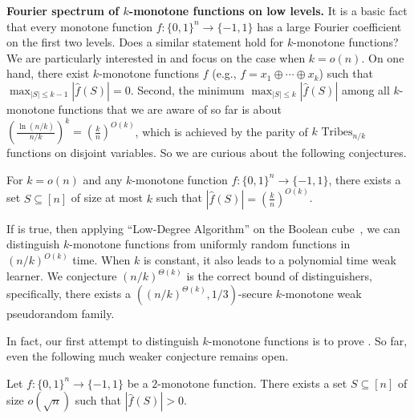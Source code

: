 \documentclass{toc}
\begin{document}
\vspace{2ex}
\noindent\textbf{Fourier spectrum of $k$-monotone functions on low levels.} It is a basic fact \cite{book} that every monotone function $f:\{0,1\}^n\rightarrow\{-1,1\}$ has a large Fourier coefficient on the first two levels. Does a similar statement hold for $k$-monotone functions? We are particularly interested in and focus on the case when $k=o(n)$. 
On one hand, there exist $k$-monotone functions $f$ (e.g., $f=x_1\oplus\cdots\oplus x_k$) such that $\max_{|S|\leq k-1}|\hat{f}(S)|=0$. Second, the minimum $\max_{|S|\leq k}|\hat{f}(S)|$ among all $k$-monotone functions that we are aware of so far is about $\left(\frac{\ln (n/k)}{n/k}\right)^k=\left(\frac{k}{n}\right)^{O(k)}$, which is achieved by the parity of $k$ $\text{Tribes}_{n/k}$ functions on disjoint variables. So we %
are curious about the following conjectures. %

%
%
%
%
%
\begin{conjecture}  %
\label{conj:fourier_spectrum} 
For $k=o(n)$ and any $k$-monotone function $f:\{0,1\}^n\rightarrow \{-1,1\}$, there exists a set $S\subseteq[n]$ of size at most $k$ such that $|\hat{f}(S)|=\left(\frac{k}{n}\right)^{O(k)}$.
\end{conjecture}

If  is true, then applying ``Low-Degree Algorithm'' on the Boolean cube~\cite{LMN93}, we can distinguish $k$-monotone functions from uniformly random functions in $(n/k)^{O(k)}$ time. When $k$ is constant, it also leads to a polynomial time weak learner. We conjecture $(n/k)^{\Theta(k)}$ is the correct bound of distinguishers, specifically, there exists a $\left((n/k)^{\Theta(k)},1/3\right)$-secure $k$-monotone weak pseudorandom family.
%

In fact, our first attempt to distinguish $k$-monotone functions is to prove . So far, even the following much weaker conjecture remains open.
%
%
%
%
\begin{conjecture}  %
\label{conj:fourier_spectrum2} 
	Let $f:\{0,1\}^n\rightarrow \{-1,1\}$ be a $2$-monotone function. There exists a set $S\subseteq[n]$ of size $o(\sqrt{n})$ such that $|\hat{f}(S)|>0$.
\end{conjecture}
\end{document}
